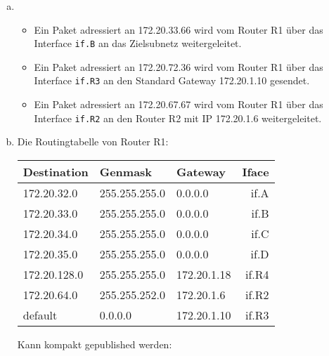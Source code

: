 

\pgfplotsset{compat=1.15}

\renewcommand{\arraystretch}{1}

\newcommand\tunderset[2]{\underset{\text{#1}}{\text{#2}}}

\date{Mittwoch 22.1.2020}


\maketitle
\thispagestyle{fancy}

\begin{enumerate}[a)]
	\item \begin{itemize}
		\item Ein Paket adressiert an 172.20.33.66 wird vom Router R1 über das Interface \texttt{if.B} an das Zielsubnetz weitergeleitet.
		\item Ein Paket adressiert an 172.20.72.36 wird vom Router R1 über das Interface \texttt{if.R3} an den Standard Gateway 172.20.1.10 gesendet.
		\item Ein Paket adressiert an 172.20.67.67 wird vom Router R1 über das Interface \texttt{if.R2} an den Router R2 mit IP 172.20.1.6 weitergeleitet.
	\end{itemize}
	\item Die Routingtabelle von Router R1: 
	\begin{center}\begin{tabular}{l|l|l|r}
		\textbf{Destination}  & \textbf{Genmask}       & \textbf{Gateway}     & \textbf{Iface}  \\ \hline
		172.20.32.0  & 255.255.255.0 & 0.0.0.0     & if.A   \\
		172.20.33.0  & 255.255.255.0 & 0.0.0.0     & if.B   \\
		172.20.34.0  & 255.255.255.0 & 0.0.0.0     & if.C   \\
		172.20.35.0  & 255.255.255.0 & 0.0.0.0     & if.D   \\
		172.20.128.0 & 255.255.255.0 & 172.20.1.18 & if.R4  \\
		172.20.64.0  & 255.255.252.0 & 172.20.1.6  & if.R2  \\
		default      & 0.0.0.0       & 172.20.1.10 & if.R3
	\end{tabular}\end{center}

	Kann kompakt gepublished werden:


\end{enumerate}
